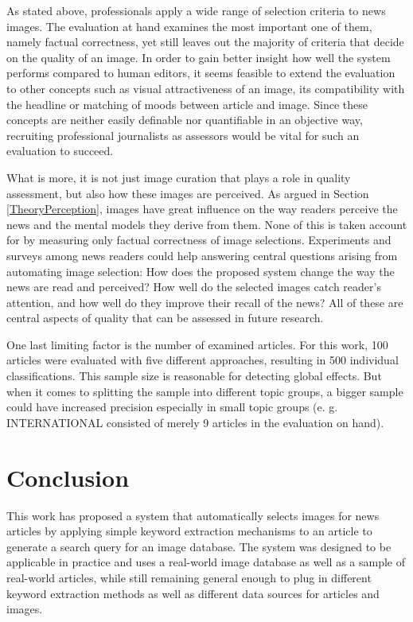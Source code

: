 \documentclass[11pt,a4paper,twoside]{article}
\begin{document}
As stated above, professionals apply a wide range of selection criteria to news images. The evaluation at hand examines the most important one of them, namely factual correctness, yet still leaves out the majority of criteria that decide on the quality of an image. In order to gain better insight how well the system performs compared to human editors, it seems feasible to extend the evaluation to other concepts such as visual attractiveness of an image, its compatibility with the headline or matching of moods between article and image. Since these concepts are neither easily definable nor quantifiable in an objective way, recruiting professional journalists as assessors would be vital for such an evaluation to succeed.

What is more, it is not just image curation that plays a role in quality assessment, but also how these images are perceived. As argued in Section \ref{TheoryPerception}, images have great influence on the way readers perceive the news and the mental models they derive from them. None of this is taken account for by measuring only factual correctness of image selections. Experiments and surveys among news readers could help answering central questions arising from automating image selection: How does the proposed system change the way the news are read and perceived? How well do the selected images catch reader's attention, and how well do they improve their recall of the news? All of these are central aspects of quality that can be assessed in future research.

One last limiting factor is the number of examined articles. For this work, 100 articles were evaluated with five different approaches, resulting in 500 individual classifications. This sample size is reasonable for detecting global effects. But when it comes to splitting the sample into different topic groups, a bigger sample could have increased precision especially in small topic groups (e. g. INTERNATIONAL consisted of merely 9 articles in the evaluation on hand).


\cleardoublepage

\section{Conclusion} \label{Conclusion}

This work has proposed a system that automatically selects images for news articles by applying simple keyword extraction mechanisms to an article to generate a search query for an image database. The system was designed to be applicable in practice and uses a real-world image database as well as a sample of real-world articles, while still remaining general enough to plug in different keyword extraction methods as well as different data sources for articles and images.
\end{document}
